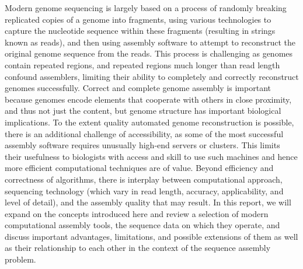Modern genome sequencing is largely based on a process of randomly breaking replicated copies of a genome into fragments, using various technologies to capture the nucleotide sequence within these fragments (resulting in strings known as reads), and then using assembly software to attempt to reconstruct the original genome sequence from the reads.
This process is challenging as genomes contain repeated regions, and repeated regions much longer than read length confound assemblers, limiting their ability to completely and correctly reconstruct genomes successfully.
Correct and complete genome assembly is important because genomes encode elements that cooperate with others in close proximity, and thus not just the content, but  genome structure has important biological implications.
To the extent quality automated genome reconstruction is possible, there is an additional challenge of accessibility, as some of the most successful assembly software requires unusually high-end servers or clusters.
This limits their usefulness to biologists with access and skill to use such machines and hence more efficient computational techniques are of value.
Beyond efficiency and correctness of algorithms, there is interplay between computational approach, sequencing technology (which vary in read length, accuracy, applicability, and level of detail), and the assembly quality that may result.
In this report, we will expand on the concepts introduced here and review a selection of modern computational assembly tools, the sequence data on which they operate, and discuss important advantages, limitations, and possible extensions of them as well as their relationship to each other in the context of the sequence assembly problem.
